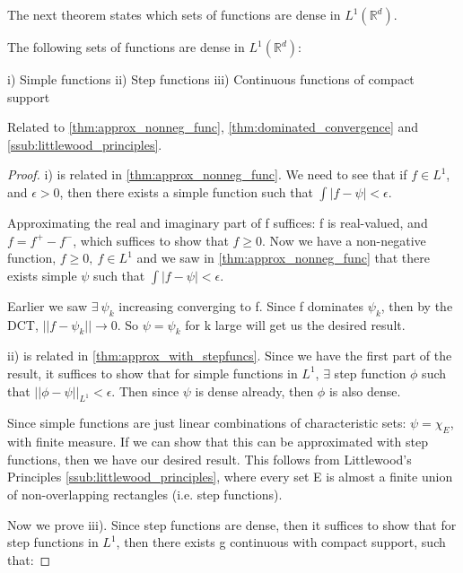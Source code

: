 \documentclass[class=article, crop=false]{standalone}
\begin{document}
			The next theorem states which sets of functions are dense in $L^1(\mathbb{R}^d)$.

			\begin{theorem}
			\label{thm:dense_in_L1_funcs}
				The following sets of functions are dense in $L^1(\mathbb{R}^d)$:

				i) Simple functions
				ii) Step functions
				iii) Continuous functions of compact support

				Related to \ref{thm:approx_nonneg_func}, \ref{thm:dominated_convergence} and \ref{ssub:littlewood_principles}.
			\end{theorem}
			\begin{proof}
				i) is related in \ref{thm:approx_nonneg_func}. We need to see that if $f \in L^1$, and $\epsilon > 0$, then there exists a simple function such that $\int | f - \psi| < \epsilon$.

				Approximating the real and imaginary part of f suffices: f is real-valued, and $f = f^+ - f^-$, which suffices to show that $f \ge 0$. Now we have a non-negative function, $f \ge 0,\ f \in L^1$ and we saw in \ref{thm:approx_nonneg_func} that there exists simple $\psi$ such that $\int | f - \psi | < \epsilon$. 

				Earlier we saw $\exists \ \psi_k$ increasing converging to f. Since f dominates $\psi_k$, then by the DCT, $||f - \psi_k|| \rightarrow 0$. So $\psi = \psi_k$ for k large will get us the desired result.

				ii) is related in \ref{thm:approx_with_stepfuncs}. Since we have the first part of the result, it suffices to show that for simple functions in $L^1$, $\exists$ step function $\phi$ such that $||\phi - \psi||_{L^1} < \epsilon$. Then since $\psi$ is dense already, then $\phi$ is also dense. 

				Since simple functions are just linear combinations of characteristic sets: $\psi = \chi_E$, with finite measure. If we can show that this can be approximated with step functions, then we have our desired result. This follows from Littlewood's Principles \ref{ssub:littlewood_principles}, where every set E is almost a finite union of non-overlapping rectangles (i.e. step functions).

				Now we prove iii). Since step functions are dense, then it suffices to show that for step functions in $L^1$, then there exists g continuous with compact support, such that:


\end{proof}
\end{document}
